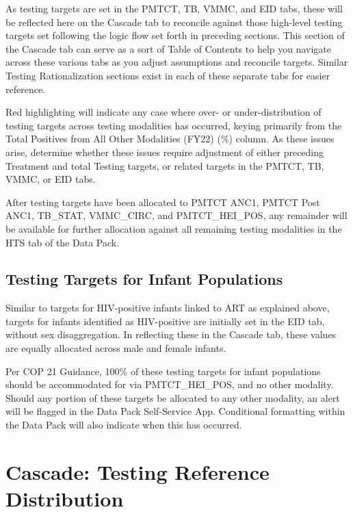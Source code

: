 \documentclass[
  openany]{book}
\begin{document}
As testing targets are set in the PMTCT, TB, VMMC, and EID tabs, these
will be reflected here on the Cascade tab to reconcile against those
high-level testing targets set following the logic flow set forth in
preceding sections. This section of the Cascade tab can serve as a sort
of Table of Contents to help you navigate across these various tabs as
you adjust assumptions and reconcile targets. Similar Testing
Rationalization sections exist in each of these separate tabs for easier
reference.

Red highlighting will indicate any case where over- or
under-distribution of testing targets across testing modalities has
occurred, keying primarily from the Total Positives from All Other
Modalities (FY22) (\%) column. As these issues arise, determine whether
these issues require adjustment of either preceding Treatment and total
Testing targets, or related targets in the PMTCT, TB, VMMC, or EID tabs.

After testing targets have been allocated to PMTCT ANC1, PMTCT Post
ANC1, TB\_STAT, VMMC\_CIRC, and PMTCT\_HEI\_POS, any remainder will be
available for further allocation against all remaining testing
modalities in the HTS tab of the Data Pack.

\hypertarget{testing-targets-for-infant-populations}{%
\subsection{Testing Targets for Infant Populations}\label{testing-targets-for-infant-populations}}

Similar to targets for HIV-positive infants linked to ART as explained
above, targets for infants identified as HIV-positive are initially set
in the EID tab, without sex disaggregation. In reflecting these in the
Cascade tab, these values are equally allocated across male and female
infants.

Per COP 21 Guidance, 100\% of these testing targets for infant
populations should be accommodated for via PMTCT\_HEI\_POS, and no other
modality. Should any portion of these targets be allocated to any other
modality, an alert will be flagged in the Data Pack Self-Service App.
Conditional formatting within the Data Pack will also indicate when this
has occurred.

\hypertarget{cascade-testing-reference-distribution}{%
\section{Cascade: Testing Reference Distribution}\label{cascade-testing-reference-distribution}}
\end{document}
